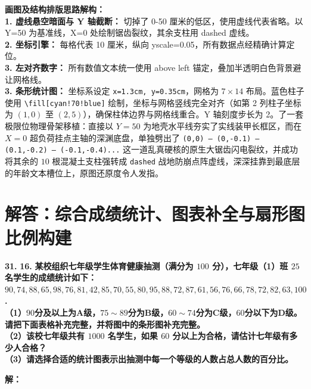 \vspace{0.4cm}
{\small\color{blue!70!black}
\textbf{画图及结构排版思路解构：}\\
\textbf{1. 虚线悬空暗面与 Y 轴截断：} 切掉了 0-50 厘米的低区，使用虚线代表省略。以 Y=50 为基准线，X=0 处绘制锯齿裂纹，其余支柱用 dashed 虚线。\\
\textbf{2. 坐标引擎：} 每格代表 10 厘米，纵向 yscale=0.05，所有数据点经精确计算定位。\\
\textbf{3. 左对齐数字：} 所有数值文本统一使用 above left 锚定，叠加半透明白色背景避让网格线。\\
\textbf{3. 条形统计图：} 坐标系设定 \texttt{x=1.3cm, y=0.35cm}，网格为 $7\times 14$ 布局。蓝色柱子使用 \texttt{\textbackslash fill[cyan!70!blue]} 绘制，坐标与网格竖线完全对齐（如第 2 列柱子坐标为 $(1,0)$ 至 $(2,5)$），确保柱体边界与网格线重合。Y 轴刻度步长为 2。了一套极限位物理骨架移植：直接以 $Y=50$ 为地壳水平线夯实了实线装甲长框区，而在 $X=0$ 超负荷挂点主轴的深渊底盘，单独劈出了 \texttt{(0,0) -- (0,-0.1) -- (0.1,-0.2) -- (-0.1,-0.4)...} 这一道乱真硬核的原生大锯齿闪电裂纹，并成功将其余的 $10$ 根混凝土支柱强转成 \texttt{dashed} 战地防崩点阵虚线，深深挂靠到最底层的年龄文本槽位上，原图还原度令人发指。\\
}
\newpage



\section{解答：综合成绩统计、图表补全与扇形图比例构建}

\vspace{0.6cm}

\textbf{\LARGE 31.} \textbf{\color{cyan!80!blue} 16. }\textbf{某校组织七年级学生体育健康抽测（满分为 $100$ 分），七年级（1）班 $25$ 名学生的成绩统计如下：\\
$90, 74, 88, 65, 98, 76, 81, 42, 85, 70, 55, 80, 95, 88, 72, 87, 61, 56, 76, 66, 78, 72, 82, 63, 100$. \\[6pt]
（1）$90$分及以上为A级，$75\sim 89$分为B级，$60\sim 74$分为C级，$60$分以下为D级。请把下面表格补充完整，并将图中的条形图补充完整。\\
（2）该校七年级共有 $1000$ 名学生，如果 $60$ 分以上为合格，请估计七年级有多少人合格？\\
（3）请选择合适的统计图表示出抽测中每一个等级的人数占总人数的百分比。}

\vspace{0.4cm}
\textbf{解：}

